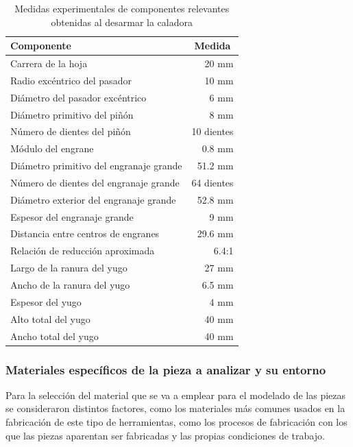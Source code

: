 \documentclass[12pt,letterpaper]{article}
\begin{document}
\begin{table}[H]
\centering
\begin{tabular}{@{}l r@{}}
\toprule
Componente & \multicolumn{1}{c}{Medida} \\
\midrule
Carrera de la hoja                      & 20 mm \\
Radio excéntrico del pasador            & 10 mm \\
Diámetro del pasador excéntrico         & 6 mm \\
Diámetro primitivo del piñón            & 8 mm \\
Número de dientes del piñón             & 10 dientes \\
Módulo del engrane                      & 0.8 mm \\
Diámetro primitivo del engranaje grande & 51.2 mm \\
Número de dientes del engranaje grande  & 64 dientes \\
Diámetro exterior del engranaje grande  & 52.8 mm \\
Espesor del engranaje grande            & 9 mm \\
Distancia entre centros de engranes     & 29.6 mm \\
Relación de reducción aproximada        & 6.4:1 \\
Largo de la ranura del yugo             & 27 mm \\
Ancho de la ranura del yugo             & 6.5 mm \\
Espesor del yugo                        & 4 mm \\
Alto total del yugo                     & 40 mm \\
Ancho total del yugo                    & 40 mm \\
\bottomrule
\end{tabular}
\caption{Medidas experimentales de componentes relevantes obtenidas al desarmar la caladora}
\end{table}

\subsubsection{Materiales específicos de la pieza a analizar y su entorno}
Para la selección del material que se va a emplear para el modelado de las piezas se consideraron distintos factores,
como los materiales más comunes usados en la fabricación de este tipo de herramientas, como los procesos de fabricación con los que las piezas aparentan ser fabricadas
y las propias condiciones de trabajo.
\\
\end{document}
